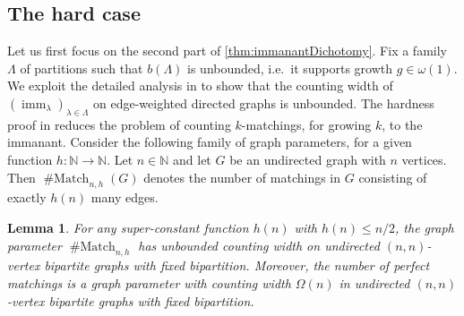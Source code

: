 \documentclass[11pt, DIV=15]{scrarticle}
\theoremstyle{definition}
\theoremstyle{plain}
\newtheorem{lemma}[definition]{Lemma}
\theoremstyle{remark}
\newcommand{\bbN}{\mathbb{N}}
\DeclareMathOperator{\imm}{imm}
\DeclareMathOperator{\Match}{\# Match}
\begin{document}
\subsection{The hard case}
Let us first focus on the second part of \cref{thm:immanantDichotomy}.
Fix a family $\Lambda$ of partitions such that $b(\Lambda)$ is unbounded, i.e.\ it supports growth $g \in \omega(1)$.
We exploit the detailed analysis in \cite{curticapean2021complexitydichotomyimmanantfamilies} to show that the counting width of $(\imm_{\lambda})_{\lambda \in \Lambda}$ on edge-weighted directed graphs is unbounded. The hardness proof in \cite{curticapean2021full} reduces the problem of counting $k$-matchings, for growing $k$, to the immanant. 
Consider the following family of graph parameters, for a given function $h\colon \bbN \to \bbN$. Let $n \in \bbN$ and let $G$ be an undirected graph with $n$ vertices. Then $\Match_{n,h}(G)$ denotes the number of matchings in $G$ consisting of exactly $h(n)$ many edges.
\begin{lemma}
	\label{lem:kMatchingUnboundedCountingWidth}
	For any super-constant function $h(n)$ with $h(n) \leq n/2$, the graph parameter $\Match_{n,h}$ has unbounded counting width on undirected $(n,n)$-vertex bipartite graphs with fixed bipartition.
	Moreover, the number of \emph{perfect} matchings is a graph parameter with counting width $\Omega(n)$ in undirected $(n,n)$-vertex bipartite graphs with fixed bipartition.
\end{lemma}	
\end{document}
